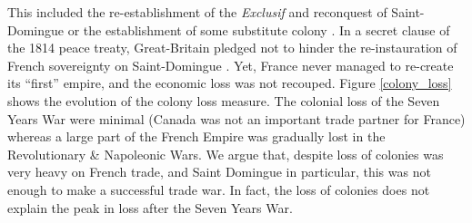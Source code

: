 \documentclass[12pt,a4paper,notitlepage,english]{article}
\begin{document}
This included the re-establishment of the \textit{Exclusif} and reconquest of Saint-Domingue or the establishment of some substitute colony \citep{Todd2011}. In a secret clause of the 1814 peace treaty, Great-Britain pledged not to hinder the re-instauration of French sovereignty on Saint-Domingue \citep{Schefer1907}. Yet, France never managed to re-create its ``first'' empire, and the economic loss was not recouped.
Figure \ref{colony_loss} shows the evolution of the colony loss measure. The colonial loss of the Seven Years War were minimal (Canada was not an important trade partner for France) whereas a large part of the French Empire was gradually lost in the Revolutionary \& Napoleonic Wars. We argue that, despite loss of colonies was very heavy on French trade, and Saint Domingue in particular, this was not enough to make a successful trade war. In fact, the loss of colonies does not explain the peak in loss after the Seven Years War.  
\end{document}
